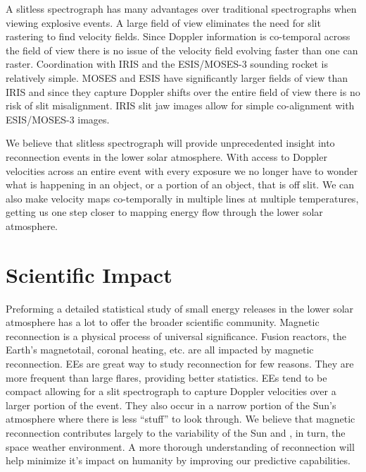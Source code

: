 \documentclass[]{aastex6}
\begin{document}
	A slitless spectrograph has many advantages over traditional spectrographs when viewing explosive events.  A large field of view eliminates the need for slit rastering to find velocity fields.  Since Doppler information is co-temporal across the field of view there is no issue of the velocity field evolving faster than one can raster. Coordination with IRIS and the ESIS/MOSES-3 sounding rocket is relatively simple. MOSES and ESIS have significantly larger fields of view than IRIS and since they capture Doppler shifts over the entire field of view there is no risk of slit misalignment.  IRIS slit jaw images allow for simple co-alignment with ESIS/MOSES-3 images.
	
	We believe that slitless spectrograph will provide unprecedented insight into reconnection events in the lower solar atmosphere. With access to Doppler velocities across an entire event with every exposure we no longer have to wonder what is happening in an object, or a portion of an object, that is off slit.  We can also make velocity maps co-temporally in multiple lines at multiple temperatures, getting us one step closer to mapping energy flow through the lower solar atmosphere.


\section{Scientific Impact}
%
Preforming a detailed statistical study of small energy releases in the lower solar atmosphere has a lot to offer the broader scientific community. Magnetic reconnection is a physical process of universal significance. Fusion reactors, the Earth's magnetotail, coronal heating, etc. are all impacted by magnetic reconnection. EEs are great way to study reconnection for few reasons. They are more frequent than large flares, providing better statistics.  EEs tend to be compact allowing for a slit spectrograph to capture Doppler velocities over a larger portion of the event.  They also occur in a narrow portion of the Sun's atmosphere where there is less ``stuff'' to look through.  We believe that magnetic reconnection contributes largely to the variability of the Sun and , in turn, the space weather environment.  A more thorough understanding of reconnection will help minimize it's impact on humanity by improving our predictive capabilities.
\end{document}
